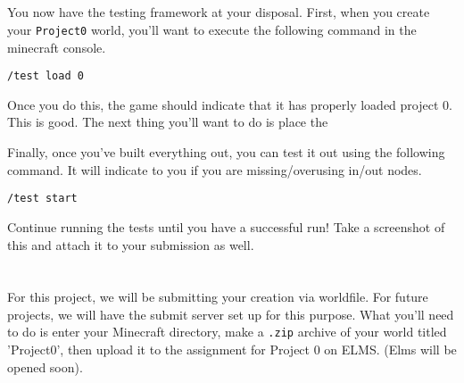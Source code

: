 \documentclass{article}
\begin{document}
\subsection{\selectfont{Testing Framework}}

You now have the testing framework at your disposal. First, when you create your \texttt{Project0} world, you'll want to execute the following command in the minecraft console.

\begin{tcolorbox}
  \texttt{/test load 0}
\end{tcolorbox}

Once you do this, the game should indicate that it has properly loaded project 0. This is good. The next thing you'll want to do is place the 

Finally, once you've built everything out, you can test it out using the following command. It will indicate to you if you are missing/overusing in/out nodes.

\begin{tcolorbox}
  \texttt{/test start}
\end{tcolorbox}

Continue running the tests until you have a successful run! Take a screenshot of this and attach it to your submission as well.

    \section{\selectfont{Submission}}
    
        \par For this project, we will be submitting your creation via worldfile. For future projects, we will have the submit server set up for this purpose. What you'll need to do is enter your Minecraft directory, make a \texttt{.zip} archive of your world titled 'Project0', then upload it to the assignment for Project 0 on ELMS. (Elms will be opened soon).
        
\end{document}
